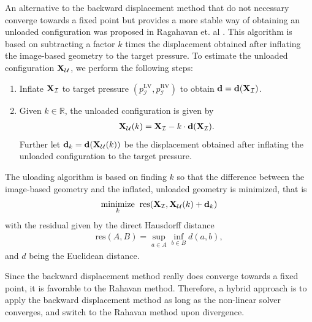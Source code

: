 An alternative to the backward displacement method that do not
necessary converge towards a fixed point but provides a more stable
way of obtaining an unloaded configuration was proposed in Ragahavan
et. al \cite{raghavan2006non}.
This algorithm is based on subtracting a factor $k$ times
the displacement obtained after inflating the image-based geometry to
the target pressure. To estimate the
unloaded configuration $\mathbf{X}_{\mathcal{U}}$, we perform the following steps:
\begin{enumerate}
  \item Inflate $\mathbf{X}_{\mathcal{I}}$ to target
    pressure $(p_{\mathcal{I}}^{\mathrm{LV}},
    p_{\mathcal{I}}^{\mathrm{RV}})$ to obtain
    $\mathbf{d} = \mathbf{d}(\mathbf{X}_{\mathcal{I}})$.
  \item Given $k \in \mathbb{R}$, the unloaded configuration is given by
    \begin{align}
      \mathbf{X}_{\mathcal{U}}(k) = \mathbf{X}_{\mathcal{I}} - k \cdot \mathbf{d}(\mathbf{X}_{\mathcal{I}}).
     \end{align}
     Further let $\mathbf{d}_k = \mathbf{d}(\mathbf{X}_{\mathcal{U}}(k))$
     be the displacement obtained after inflating the unloaded
     configuration to the target pressure.
   \end{enumerate}
The uloading algorithm is based on finding $k$ so that the difference
between the image-based geometry and the inflated, unloaded geometry
is minimized, that is 
\begin{align}
  \underset{k}{\text{minimize}}
  \;\;  \mathrm{res} ( \mathbf{X}_{\mathcal{I}}, \mathbf{X}_{\mathcal{U}}(k) + \mathbf{d}_k)
  \label{eq:unloading_Raghavan}
\end{align}
with the residual given by the direct Hausdorff distance \cite{huttenlocher1993comparing}
\begin{align}
  \mathrm{res}(A, B) = \sup_{a \in A} \inf_{b \in B} d(a, b), 
\end{align}
and $d$ being the Euclidean distance. 



Since the backward displacement method really does converge towards a
fixed point, it is favorable to the Rahavan method. Therefore, a
hybrid approach is to apply the backward displacement method as
long as the non-linear solver converges, and switch to the Rahavan
method upon divergence.



